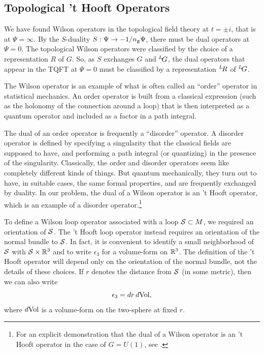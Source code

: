 
\subsection{Topological 't Hooft Operators}

\label{sec:tophooft}

We have found Wilson operators in the topological field theory at
$t=\pm i$, that is at $\Psi=\infty$.  By  the $S$-duality
$S:\Psi\to -1/n_{\frak g}\Psi$, there must be dual operators at
$\Psi=0$. The topological Wilson operators were classified by the
choice of a representation $R$ of $G$.  So, as $S$ exchanges $G$
and $^L\negthinspace G$, the dual operators that appear in the
TQFT at $\Psi=0$ must be classified by a representation
$^L\negthinspace R$ of $^L\negthinspace G$.

The Wilson operator is an example of what is often called an
``order'' operator in statistical mechanics.  An order operator is
built from a classical expression (such as the holonomy of the
connection around a loop) that is then interpreted as a quantum
operator and included as a factor in a path integral.

The dual of an order operator is frequently a ``disorder''
operator.  A disorder operator is defined by specifying a
singularity that the classical fields are supposed to have, and
performing a path integral (or quantizing) in the presence of the
singularity.  Classically, the order and disorder operators seem
like completely different kinds of things.  But quantum
mechanically, they turn out to have, in suitable cases, the same
formal properties, and are frequently exchanged by duality. In our
problem, the dual of a Wilson operator is an 't Hooft  operator,
which is an example of a disorder operator.\footnote{For an explicit
demonstration that the dual of a Wilson operator is an 't Hooft
operator in the case of $G=U(1)$, see \cite{ref89}.}

To define a Wilson loop operator associated with a loop ${\cal
S}\subset M$, we required an orientation of ${\cal S}$.  The 't
Hooft loop operator instead requires an orientation of the normal
bundle to ${\cal S}$.  In fact, it is convenient to identify a
small neighborhood of ${\cal S}$ with ${\cal S}\times \Bbb{R}^3$
and to write $\epsilon_3$ for a volume-form on $\Bbb{R}^3$.  The
definition of the 't Hooft operator will depend only on the
orientation of the normal bundle, not the details of these
choices. If $r$ denotes the distance from ${\cal S}$ (in some
metric), then we can also write %
\setcounter{equation}{5}
\begin{equation}\label{eq:congo}
\epsilon_3=dr\,d{\rm
Vol},
\end{equation}
 where $d{\rm Vol}$ is a volume-form on the two-sphere at
fixed $r$.

